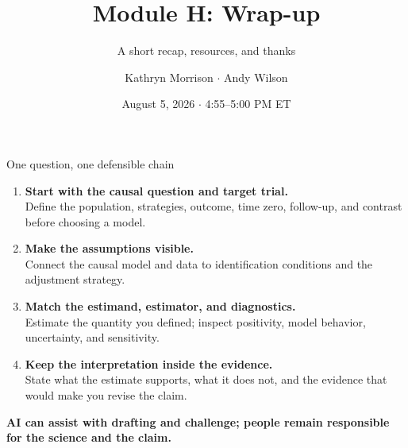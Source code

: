\documentclass[aspectratio=169,10pt]{beamer}
\title{Module H: Wrap-up}
\subtitle{A short recap, resources, and thanks}
\author{Kathryn Morrison \(\cdot\) Andy Wilson}
\institute{Data Can Deceive: Causal Roadmaps with (and without) AI}
\date{August 5, 2026 \(\cdot\) 4:55--5:00 PM ET}
\begin{document}
\instatstitle

\begin{frame}[t]{One question, one defensible chain}
  \vspace*{0.28cm}

  \begin{enumerate}
    \setlength{\itemsep}{0.26cm}
    \item \textbf{Start with the causal question and target trial.}\\
      Define the population, strategies, outcome, time zero, follow-up, and
      contrast before choosing a model.
    \item \textbf{Make the assumptions visible.}\\
      Connect the causal model and data to identification conditions and the
      adjustment strategy.
    \item \textbf{Match the estimand, estimator, and diagnostics.}\\
      Estimate the quantity you defined; inspect positivity, model behavior,
      uncertainty, and sensitivity.
    \item \textbf{Keep the interpretation inside the evidence.}\\
      State what the estimate supports, what it does not, and the evidence that
      would make you revise the claim.
  \end{enumerate}

  \vspace{0.04cm}
  \begin{center}
    {\scriptsize\color{accent}\bfseries AI can assist with drafting and challenge;
    people remain responsible for the science and the claim.}
  \end{center}
\end{frame}
\end{document}
